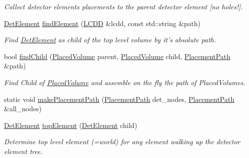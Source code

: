 \begin{DoxyCompactItemize}
\begin{DoxyCompactList}\small\item\em Collect detector elements placements to the parent detector element \mbox{[}no holes!\mbox{]}. \item\end{DoxyCompactList}\item 
\hyperlink{class_d_d4hep_1_1_geometry_1_1_det_element}{DetElement} \hyperlink{namespace_d_d4hep_1_1_geometry_1_1_detector_tools_a70cde605976780186eb6b226731ed380}{findElement} (\hyperlink{class_d_d4hep_1_1_geometry_1_1_l_c_d_d}{LCDD} \&lcdd, const std::string \&path)
\begin{DoxyCompactList}\small\item\em Find \hyperlink{class_d_d4hep_1_1_geometry_1_1_det_element}{DetElement} as child of the top level volume by it's absolute path. \item\end{DoxyCompactList}\item 
bool \hyperlink{namespace_d_d4hep_1_1_geometry_1_1_detector_tools_a1bb51943ab0395ee0b1e4441b6a6b92a}{findChild} (\hyperlink{class_d_d4hep_1_1_geometry_1_1_placed_volume}{PlacedVolume} parent, \hyperlink{class_d_d4hep_1_1_geometry_1_1_placed_volume}{PlacedVolume} child, \hyperlink{namespace_d_d4hep_1_1_geometry_1_1_detector_tools_a6cc33285199e04dd336a33e6e62925e6}{PlacementPath} \&path)
\begin{DoxyCompactList}\small\item\em Find Child of \hyperlink{class_d_d4hep_1_1_geometry_1_1_placed_volume}{PlacedVolume} and assemble on the fly the path of PlacedVolumes. \item\end{DoxyCompactList}\item 
static void \hyperlink{namespace_d_d4hep_1_1_geometry_1_1_detector_tools_adc948b938f4fbbdc46ad6f47f35059a0}{makePlacementPath} (\hyperlink{namespace_d_d4hep_1_1_geometry_1_1_detector_tools_a6cc33285199e04dd336a33e6e62925e6}{PlacementPath} det\_\-nodes, \hyperlink{namespace_d_d4hep_1_1_geometry_1_1_detector_tools_a6cc33285199e04dd336a33e6e62925e6}{PlacementPath} \&all\_\-nodes)
\item 
\hyperlink{class_d_d4hep_1_1_geometry_1_1_det_element}{DetElement} \hyperlink{namespace_d_d4hep_1_1_geometry_1_1_detector_tools_aa2a3cf3ac7fbdabef840f02eb0d60d91}{topElement} (\hyperlink{class_d_d4hep_1_1_geometry_1_1_det_element}{DetElement} child)
\begin{DoxyCompactList}\small\item\em Determine top level element (=world) for any element walking up the detector element tree. \item\end{DoxyCompactList}\item 

\end{DoxyCompactItemize}

